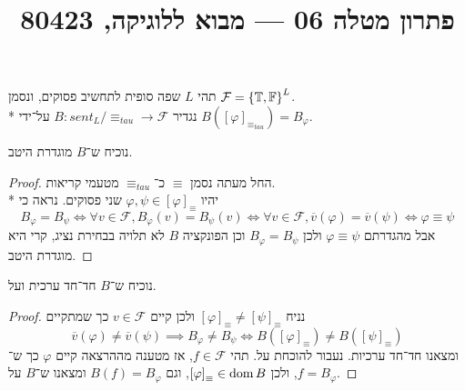
\title{פתרון מטלה 06 --- מבוא ללוגיקה, 80423}


\maketitle
\maketitleprint{}

\question{}
תהי $L$ שפה סופית לתחשיב פסוקים, ונסמן $\mathcal{F} = {\{\mathbb{T}, \mathbb{F}\}}^L$. \\*
נגדיר $B : sent_L / \equiv_{tau} \to \mathcal{F}$ על־ידי $B({[\varphi]}_{\equiv_{tau}}) = B_\varphi$.

\subquestion{}
נוכיח ש־$B$ מוגדרת היטב.
\begin{proof}
	החל מעתה נסמן $\equiv$ כ־$\equiv_{tau}$ מטעמי קריאות. \\*
	יהיו $\varphi, \psi \in {[\varphi]}_\equiv$ שני פסוקים. נראה כי
	\[
		B_\varphi = B_\psi
		\iff \forall v \in \mathcal{F}, B_\varphi(v) = B_\psi(v)
		\iff \forall v \in \mathcal{F}, \overline{v}(\varphi) = \overline{v}(\psi)
		\iff \varphi \equiv \psi
	\]
	אבל מהגדרתם $\varphi \equiv \psi$ ולכן $B_\varphi = B_\psi$ וכן הפונקציה $B$ לא תלויה בבחירת נציג, קרי היא מוגדרת היטב.
\end{proof}

\subquestion{}
נוכיח ש־$B$ חד־חד ערכית ועל.
\begin{proof}
	נניח ${[\varphi]}_\equiv \ne {[\psi]}_\equiv$ ולכן קיים $v \in \mathcal{F}$ כך שמתקיים
	\[
		\overline{v}(\varphi) \ne \overline{v}(\psi)
		\implies B_\varphi \ne B_\psi
		\iff B({[\varphi]}_\equiv) \ne B({[\psi]}_\equiv)
	\]
	ומצאנו חד־חד ערכיות. נעבור להוכחת על.
	תהי $f \in \mathcal{F}$, אז מטענה מההרצאה קיים $\varphi$ כך ש־$f = B_\varphi$, ולכן ${[\varphi]}_\equiv \in \operatorname{dom} B$, וגם $B(f) = B_\varphi$ ומצאנו ש־$B$ על.
\end{proof}

